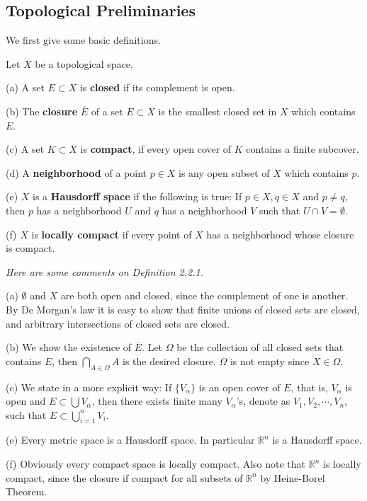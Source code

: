 \subsection{Topological Preliminaries}
We first give some basic definitions.
\begin{definition}
Let $X$ be a topological space.\par
(a) A set $E\subset X$ is \textbf{closed} if its complement is open.\par
(b) The \textbf{closure} $\overline{E}$ of a set $E\subset X$ is the smallest closed set in $X$ which contains $E$.\par
(c) A set $K\subset X$ is \textbf{compact}, if every open cover of $K$ contains a finite subcover.\par
(d) A \textbf{neighborhood} of a point $p\in X$ is any open subset of $X$ which contains $p$.\par
(e) $X$ is a \textbf{Hausdorff space} if the following is true: If $p\in X,q\in X$ and $p\ne q$, then $p$ has a neighborhood $U$ and $q$ has a neighborhood $V$ such that $U\cap V=\emptyset$.\par
(f) $X$ is \textbf{locally compact} if every point of $X$ has a neighborhood whose closure is compact.
\end{definition}
\begin{note}\em
Here are some comments on Definition 2.2.1.\par
(a) $\emptyset$ and $X$ are both open and closed, since the complement of one is another. By De Morgan's law it is easy to show that finite unions of closed sets are closed, and arbitrary intersections of closed sets are closed.\par
(b) We show the existence of $\overline{E}$. Let $\Omega$ be the collection of all closed sets that contains $E$, then $\bigcap_{A\in\Omega}A$ is the desired closure. $\Omega$ is not empty since $X\in\Omega$.\par
(c) We state in a more explicit way: If $\{V_\alpha\}$ is an open cover of $E$, that is, $V_\alpha$ is open and $E\subset\bigcup V_\alpha$, then there exists finite many $V_\alpha$'s, denote as $V_1,V_2,\cdots,V_n$, such that $E\subset\bigcup_{i=1}^nV_i$.\par
(e) Every metric space is a Hausdorff space. In particular $\mathbb{R}^n$ is a Hausdorff space.\par
(f) Obviously every compact space is locally compact. Also note that $\mathbb{R}^n$ is locally compact, since the closure if compact for all subsets of $\mathbb{R}^n$ by Heine-Borel Theorem.
\end{note}
